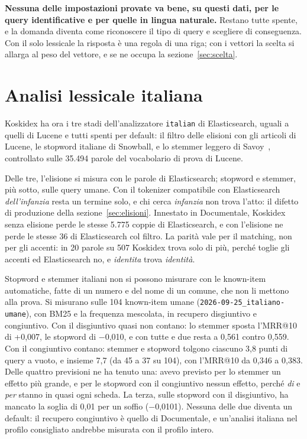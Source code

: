 \textbf{Nessuna delle impostazioni provate va bene, su questi dati, per le query
identificative e per quelle in lingua naturale.} Restano tutte spente, e la domanda diventa come
riconoscere il tipo di query e scegliere di conseguenza. Con il solo lessicale la
risposta è una regola di una riga; con i vettori la scelta si allarga al peso del
vettore, e se ne occupa la sezione~\ref{sec:scelta}.

\section{Analisi lessicale italiana}\label{sec:italiana}

Koskidex ha ora i tre stadi dell'analizzatore \texttt{italian} di Elasticsearch,
uguali a quelli di Lucene e tutti spenti per default: il filtro delle elisioni con
gli articoli di Lucene, le stopword italiane di Snowball, e lo stemmer leggero di
Savoy~\cite{savoy2002light}, controllato sulle 35.494 parole del vocabolario di
prova di Lucene.

Delle tre, l'elisione si misura con le parole di Elasticsearch; stopword e stemmer, più sotto, sulle query umane. Con il tokenizer compatibile con
Elasticsearch \emph{dell'infanzia} resta un termine solo, e chi cerca
\emph{infanzia} non trova l'atto: il difetto di produzione della
sezione~\ref{sec:elisioni}. Innestato in Documentale, Koskidex senza elisione
perde le stesse 5.775 coppie di Elasticsearch, e con l'elisione ne perde le stesse
36 di Elasticsearch col filtro. La parità vale per il matching, non per gli
accenti: in 20 parole su 507 Koskidex trova solo di più, perché toglie gli accenti
ed Elasticsearch no, e \emph{identita} trova \emph{identità}.

Stopword e stemmer italiani non si possono misurare con le known-item
automatiche, fatte di un numero e del nome di un comune, che non li mettono alla
prova. Si misurano sulle 104 known-item umane (\texttt{2026-09-25\_italiano-umane}),
con BM25 e la frequenza mescolata, in recupero disgiuntivo e congiuntivo. Con
il disgiuntivo quasi non contano: lo stemmer sposta l'MRR@10 di +0,007, le
stopword di $-$0,010, e con tutte e due resta a 0,561 contro 0,559. Con il
congiuntivo contano: stemmer e stopword tolgono ciascuno 3,8 punti di query a
vuoto, e insieme 7,7 (da 45 a 37 su 104), con l'MRR@10 da 0,346 a 0,383. Delle
quattro previsioni ne ha tenuto una: avevo previsto per lo stemmer un
effetto più grande, e per le stopword con il congiuntivo nessun effetto, perché
\emph{di} e \emph{per} stanno in quasi ogni scheda. La terza, sulle stopword con
il disgiuntivo, ha mancato la soglia di 0,01 per un soffio ($-$0,0101). Nessuna delle due diventa un
default: il recupero congiuntivo è quello di Documentale, e un'analisi italiana
nel profilo consigliato andrebbe misurata con il profilo intero.

